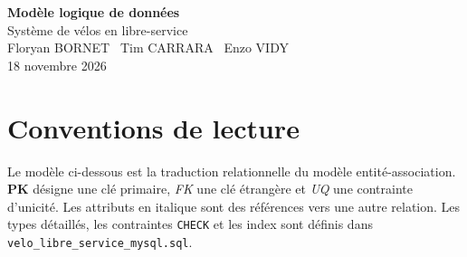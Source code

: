 \documentclass[11pt,a4paper]{article}
\newcommand{\pk}{\textbf{PK}}
\newcommand{\fk}{\textit{FK}}
\newcommand{\uq}{\textit{UQ}}
\begin{document}
\begin{center}
{\LARGE\textbf{Modèle logique de données}}\\[0.4em]
{\large Système de vélos en libre-service}\\[0.8em]
Floryan BORNET \textperiodcentered\ Tim CARRARA \textperiodcentered\ Enzo VIDY\\
18 novembre 2026
\end{center}

\section{Conventions de lecture}
Le modèle ci-dessous est la traduction relationnelle du modèle entité-association. \pk{} désigne une clé primaire, \fk{} une clé étrangère et \uq{} une contrainte d'unicité. Les attributs en italique sont des références vers une autre relation. Les types détaillés, les contraintes \texttt{CHECK} et les index sont définis dans \texttt{velo\_libre\_service\_mysql.sql}.
\end{document}
